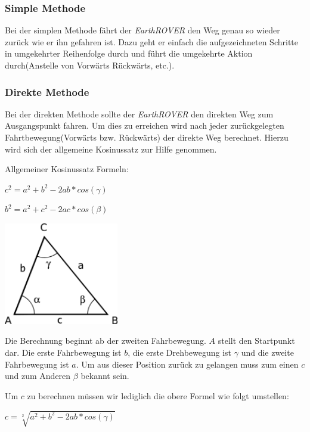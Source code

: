 \subsubsection{Simple Methode}
\label{lbl:simplemethod}
Bei der simplen Methode fährt der \textit{EarthROVER} den Weg genau so wieder zurück wie er ihn gefahren ist. Dazu geht er einfach die aufgezeichneten Schritte in umgekehrter Reihenfolge durch und führt die umgekehrte Aktion durch(Anstelle von Vorwärts Rückwärts, etc.).

\subsubsection{Direkte Methode}
Bei der direkten Methode sollte der \textit{EarthROVER} den direkten Weg zum Ausgangspunkt fahren. Um dies zu erreichen wird nach jeder zurückgelegten Fahrtbewegung(Vorwärts bzw. Rückwärts) der direkte Weg berechnet. Hierzu wird sich der allgemeine Kosinussatz zur Hilfe genommen.

\begin{capdefinition}{Allgemeiner Kosinussatz}
	Formeln:
	
	$c^2 = a^2 + b^2 - 2ab*cos(\gamma)$
	
	$b^2 = a^2 + c^2 - 2ac*cos(\beta)$
\end{capdefinition}

\begin{capfigure}[Kosinussatz]
	\includegraphics[width=5cm]{images/implementation/cosinus}
\end{capfigure}

Die Berechnung beginnt ab der zweiten Fahrbewegung. $A$ stellt den Startpunkt dar. Die erste Fahrbewegung ist $b$, die erste Drehbewegung ist $\gamma$ und die zweite Fahrbewegung ist $a$. Um aus dieser Position zurück zu gelangen muss zum einen $c$ und zum Anderen $\beta$ bekannt sein.

Um $c$ zu berechnen müssen wir lediglich die obere Formel wie folgt umstellen:

$c = \sqrt[2]{a^2 + b^2 - 2ab*cos(\gamma)}$

